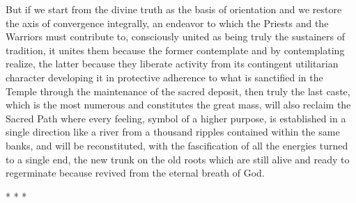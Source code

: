 But if we start from the divine truth as the basis of orientation and we restore the axis of convergence integrally, an endeavor to which the Priests and the Warriors must contribute to, consciously united as being truly the sustainers of tradition, it unites them because the former contemplate and by contemplating realize, the latter because they liberate activity from its contingent utilitarian character developing it in protective adherence to what is sanctified in the Temple through the maintenance of the sacred deposit, then truly the last caste, which is the most numerous and constitutes the great mass, will also reclaim the Sacred Path where every feeling, symbol of a higher purpose, is established in a single direction like a river from a thousand ripples contained within the same banks, and will be reconstituted, with the fascification of all the energies turned to a single end, the new trunk on the old roots which are still alive and ready to regerminate because revived from the eternal breath of God.


\begin{center}* * *\end{center}

